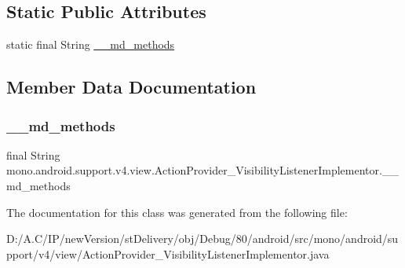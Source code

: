 \subsection*{Static Public Attributes}
\begin{DoxyCompactItemize}
\item 
static final String \hyperlink{classmono_1_1android_1_1support_1_1v4_1_1view_1_1_action_provider___visibility_listener_implementor_afe06803b18ae0e7f0a030aee26e1ad1d}{\+\_\+\+\_\+md\+\_\+methods}
\end{DoxyCompactItemize}


\subsection{Member Data Documentation}
\mbox{\label{classmono_1_1android_1_1support_1_1v4_1_1view_1_1_action_provider___visibility_listener_implementor_afe06803b18ae0e7f0a030aee26e1ad1d}} 
\subsubsection{\texorpdfstring{\+\_\+\+\_\+md\+\_\+methods}{\_\_md\_methods}}
{\footnotesize\ttfamily final String mono.\+android.\+support.\+v4.\+view.\+Action\+Provider\+\_\+\+Visibility\+Listener\+Implementor.\+\_\+\+\_\+md\+\_\+methods\hspace{0.3cm}{\ttfamily [static]}}



The documentation for this class was generated from the following file\+:\begin{DoxyCompactItemize}
\item 
D\+:/\+A.\+C/\+I\+P/new\+Version/st\+Delivery/obj/\+Debug/80/android/src/mono/android/support/v4/view/Action\+Provider\+\_\+\+Visibility\+Listener\+Implementor.\+java\end{DoxyCompactItemize}
